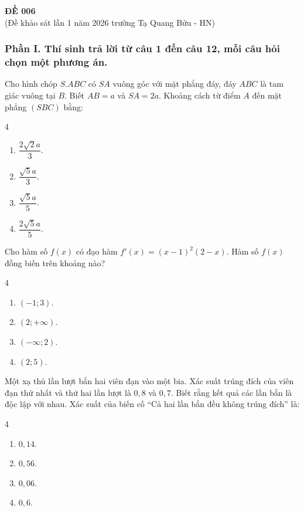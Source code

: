 \begin{center}
	\textbf{{\Huge ĐỀ 006}}\\
	(Đề khảo sát lần 1 năm 2026 trường Tạ Quang Bửu - HN)
\end{center}
\subsubsection*{Phần I. Thí sinh trả lời từ câu 1 đến câu 12, mỗi câu hỏi chọn một phương án.}
\setcounter{bt}{0}
\begin{baitap}
	Cho hình chóp $S.ABC$ có $SA$ vuông góc với mặt phẳng đáy, đáy $ABC$ là tam giác vuông tại $B$. Biết $AB=a$ và $SA=2a$. Khoảng cách từ điểm $A$ đến mặt phẳng $(SBC)$ bằng:
	\begin{multicols}{4}
		\begin{enumerate}[\quad \bf A.]
			\item $\dfrac{2\sqrt{2}a}{3}$.
			\item $\dfrac{\sqrt{5}a}{3}$.
			\item $\dfrac{\sqrt{5}a}{5}$.
			\item $\dfrac{2\sqrt{5}a}{5}$.
		\end{enumerate}
	\end{multicols}
\end{baitap}

\begin{baitap}
	Cho hàm số $f(x)$ có đạo hàm $f'(x)=(x-1)^2(2-x)$. Hàm số $f(x)$ đồng biến trên khoảng nào?
	\begin{multicols}{4}
		\begin{enumerate}[\quad \bf A.]
			\item $(-1;3)$.
			\item $(2;+\infty)$.
			\item $(-\infty;2)$.
			\item $(2;5)$.
		\end{enumerate}
	\end{multicols}
\end{baitap}

\begin{baitap}
	Một xạ thủ lần lượt bắn hai viên đạn vào một bia. Xác suất trúng đích của viên đạn thứ nhất và thứ hai lần lượt là $0{,}8$ và $0{,}7$. Biết rằng kết quả các lần bắn là độc lập với nhau. Xác suất của biến cố ``Cả hai lần bắn đều không trúng đích'' là:
	\begin{multicols}{4}
		\begin{enumerate}[\quad \bf A.]
			\item $0{,}14$.
			\item $0{,}56$.
			\item $0{,}06$.
			\item $0{,}6$.
		\end{enumerate}
	\end{multicols}
\end{baitap}

